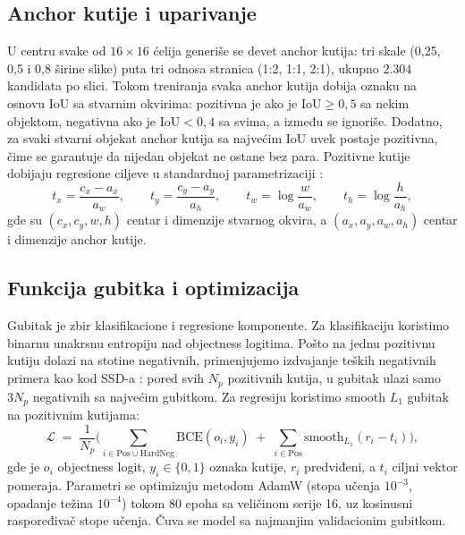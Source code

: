 \documentclass[11pt,a4paper]{article}
\begin{document}
\subsection{Anchor kutije i uparivanje}
\label{sec:anchors}

U centru svake od $16\times16$ ćelija generiše se devet anchor kutija: tri
skale (0,25, 0,5 i 0,8 širine slike) puta tri odnosa stranica (1:2, 1:1,
2:1), ukupno $2.304$ kandidata po slici. Tokom treniranja svaka anchor kutija
dobija oznaku na osnovu IoU sa stvarnim okvirima: pozitivna je ako je
$\mathrm{IoU} \ge 0{,}5$ sa nekim objektom, negativna ako je
$\mathrm{IoU} < 0{,}4$ sa svima, a između se ignoriše. Dodatno, za svaki
stvarni objekat anchor kutija sa najvećim IoU uvek postaje pozitivna, čime
se garantuje da nijedan objekat ne ostane bez para. Pozitivne kutije dobijaju
regresione ciljeve u standardnoj parametrizaciji \cite{ren2015faster}:
\begin{equation}
t_x = \frac{c_x - a_x}{a_w}, \qquad
t_y = \frac{c_y - a_y}{a_h}, \qquad
t_w = \log\frac{w}{a_w}, \qquad
t_h = \log\frac{h}{a_h},
\end{equation}
gde su $(c_x, c_y, w, h)$ centar i dimenzije stvarnog okvira, a
$(a_x, a_y, a_w, a_h)$ centar i dimenzije anchor kutije.

\subsection{Funkcija gubitka i optimizacija}

Gubitak je zbir klasifikacione i regresione komponente. Za klasifikaciju
koristimo binarnu unakrsnu entropiju nad objectness logitima. Pošto na jednu
pozitivnu kutiju dolazi na stotine negativnih, primenjujemo izdvajanje teških
negativnih primera kao kod SSD-a \cite{liu2016ssd}: pored svih $N_p$ pozitivnih
kutija, u gubitak ulazi samo $3N_p$ negativnih sa najvećim gubitkom. Za
regresiju koristimo smooth $L_1$ gubitak \cite{ren2015faster} na pozitivnim
kutijama:
\begin{equation}
\mathcal{L} \;=\; \frac{1}{N_p}\Big(
\sum_{i \in \mathrm{Pos} \cup \mathrm{HardNeg}} \mathrm{BCE}(o_i, y_i)
\;+\;
\sum_{i \in \mathrm{Pos}} \mathrm{smooth}_{L_1}(r_i - t_i)
\Big),
\end{equation}
gde je $o_i$ objectness logit, $y_i \in \{0,1\}$ oznaka kutije, $r_i$
predviđeni, a $t_i$ ciljni vektor pomeraja. Parametri se optimizuju metodom
AdamW \cite{loshchilov2019adamw} (stopa učenja $10^{-3}$, opadanje težina
$10^{-4}$) tokom 80 epoha sa veličinom serije 16, uz kosinusni
raspoređivač stope učenja. Čuva se model sa najmanjim validacionim
gubitkom.
\end{document}

